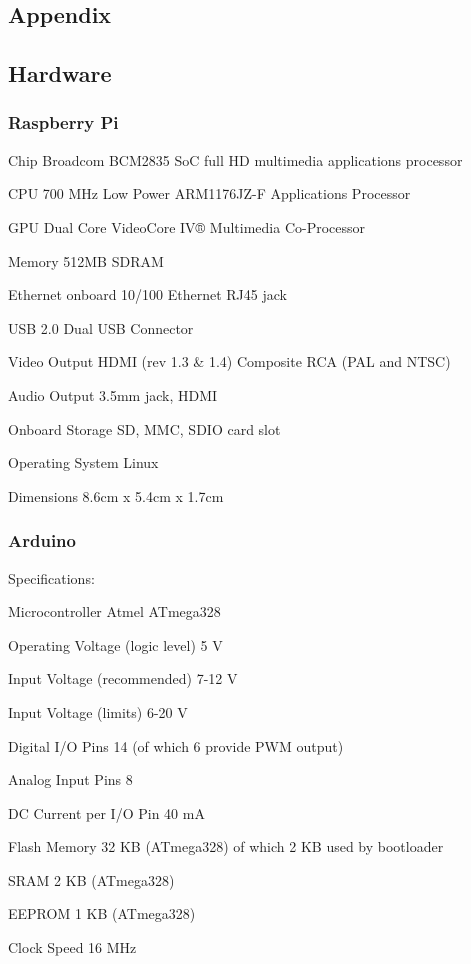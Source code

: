 \documentclass[12pt]{report}
\begin{document}
\begin{appendices}
\chapter{Appendix}
\section{Hardware}
\subsection*{Raspberry Pi}

Chip Broadcom BCM2835 SoC full HD multimedia applications processor

CPU 700 MHz Low Power ARM1176JZ-F Applications Processor

GPU	Dual Core VideoCore IV® Multimedia Co-Processor
	  	
Memory 512MB SDRAM

Ethernet onboard 10/100 Ethernet RJ45 jack

USB 2.0 Dual USB Connector

Video Output HDMI (rev 1.3 \& 1.4) Composite RCA (PAL and NTSC)

Audio Output 3.5mm jack, HDMI

Onboard Storage SD, MMC, SDIO card slot

Operating System Linux

Dimensions 8.6cm x 5.4cm x 1.7cm
\subsection*{Arduino}

Specifications:

Microcontroller	Atmel ATmega328

Operating Voltage (logic level)	5 V

Input Voltage (recommended)	7-12 V

Input Voltage (limits)	6-20 V

Digital I/O Pins	14 (of which 6 provide PWM output)

Analog Input Pins	8

DC Current per I/O Pin	40 mA

Flash Memory	32 KB (ATmega328) of which 2 KB used by bootloader

SRAM  2 KB (ATmega328)

EEPROM	1 KB (ATmega328)

Clock Speed	16 MHz


\end{appendices}
\end{document}
